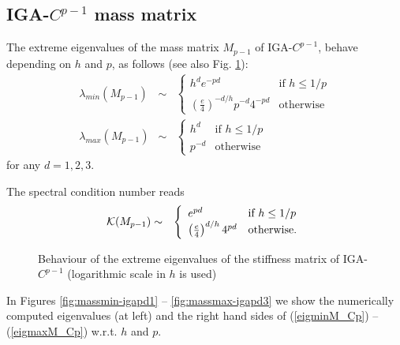 \documentclass[11pt]{article}
\begin{document}
\clearpage
\newpage

\subsection{IGA-$C^{p-1}$ mass matrix}


The extreme eigenvalues of the
mass matrix $M_{p-1}$ of IGA-$C^{p-1}$,
behave depending on $h$ and $p$, as follows (see also
Fig. \ref{fig:mass-igap}):
\begin{eqnarray}
\label{eigminM_Cp}
\lambda_{min}(M_{p-1})&\sim &\left\{\begin{array}{ll}
h^d e^{-pd}& \mbox{if } h\leq 1/p\\
\left(\frac{e}{4}\right)^{-d/h}p^{-d}4^{-pd}&\mbox{otherwise}
\end{array}\right.\\
\label{eigmaxM_Cp}
\lambda_{max}(M_{p-1})&\sim &
\left\{\begin{array}{ll}
h^d & \mbox{if } h\leq 1/p\\
p^{-d}  &\mbox{otherwise}
\end{array}\right.
\end{eqnarray}
for any $d=1,2,3$. 

The spectral condition number reads
\begin{eqnarray}
\label{cond_M_Cp}
{\cal K}(M_{p-1})&\sim &\left\{\begin{array}{ll}
 e^{pd}& \mbox{if } h\leq 1/p\\
\left(\frac{e}{4}\right)^{d/h}4^{pd}&\mbox{otherwise.}
\end{array}\right.
\end{eqnarray}

\begin{figure}[h]
\begin{center}
\scalebox{0.5}{}
\end{center}
\caption{Behaviour of the extreme eigenvalues of the stiffness
 matrix of IGA-$C^{p-1}$ (logarithmic scale in $h$ is used)}
\label{fig:mass-igap}
\end{figure}


In Figures \ref{fig:massmin-igapd1} -- \ref{fig:massmax-igapd3} we show
the numerically computed eigenvalues (at left) and the right hand sides of
(\ref{eigminM_Cp}) --
(\ref{eigmaxM_Cp}) w.r.t. $h$ and $p$.
\end{document}
